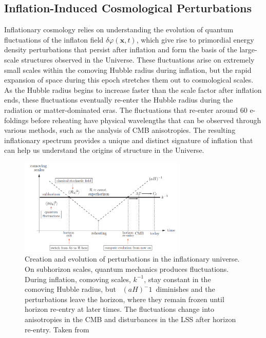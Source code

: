 \subsection{Inflation-Induced Cosmological Perturbations} \label{section 2.4}
 Inflationary cosmology relies on understanding the evolution of quantum fluctuations of the inflaton field $\delta \varphi(\mathbf{x},t)$, which give rise to primordial energy density perturbations that persist after inflation and form the basis of the large-scale structures observed in the Universe. These fluctuations arise on extremely small scales within the comoving Hubble radius during inflation, but the rapid expansion of space during this epoch stretches them out to cosmological scales. As the Hubble radius begins to increase faster than the scale factor after inflation ends, these fluctuations eventually re-enter the Hubble radius during the radiation or matter-dominated eras. The fluctuations that re-enter around 60 e-foldings before reheating have physical wavelengths that can be observed through various methods, such as the analysis of CMB anisotropies. The resulting inflationary spectrum provides a unique and distinct signature of inflation that can help us understand the origins of structure in the Universe. \\

 \begin{figure}[h]
    \centering
    \includegraphics[width=0.7\textwidth]{comving vs conformal time.png}
    \caption{Creation and evolution of perturbations in the inflationary universe. On subhorizon scales, quantum mechanics produces fluctuations. During inflation, comoving scales, $k^{-1}$, stay constant in the comoving Hubble radius, but  $(aH)^-{1}$ diminishes and the perturbations leave the horizon, where they remain frozen until horizon re-entry at later times. The fluctuations change into anisotropies in the CMB and disturbances in the LSS after horizon re-entry. Taken from \cite{baumann2012tasi}}
    \label{fig:2.3} 
\end{figure}

